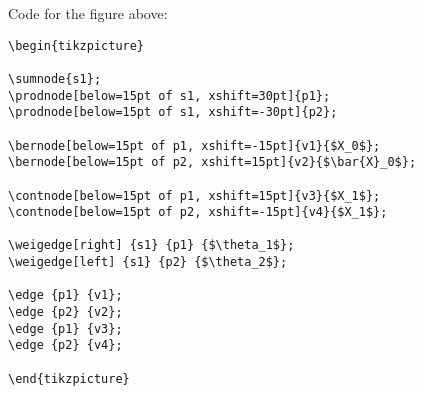 \documentclass[11pt]{article}
\begin{document}
Code for the figure above:
\begin{verbatim}
\begin{tikzpicture}

\sumnode{s1};
\prodnode[below=15pt of s1, xshift=30pt]{p1};
\prodnode[below=15pt of s1, xshift=-30pt]{p2};

\bernode[below=15pt of p1, xshift=-15pt]{v1}{$X_0$};
\bernode[below=15pt of p2, xshift=15pt]{v2}{$\bar{X}_0$};
	
\contnode[below=15pt of p1, xshift=15pt]{v3}{$X_1$};
\contnode[below=15pt of p2, xshift=-15pt]{v4}{$X_1$};
	
\weigedge[right] {s1} {p1} {$\theta_1$};
\weigedge[left] {s1} {p2} {$\theta_2$};

\edge {p1} {v1};
\edge {p2} {v2};
\edge {p1} {v3};
\edge {p2} {v4};  

\end{tikzpicture}

\end{verbatim}
\end{document}
